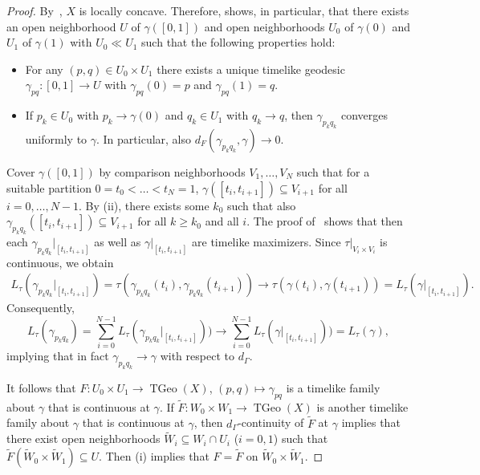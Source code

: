 \documentclass[a4paper,11pt]{article}
\numberwithin{equation}{section}
\theoremstyle{plain}
\theoremstyle{definition}
\DeclareMathOperator{\TGeo}{TGeo}
\begin{document}
\begin{proof} By~\cite[Rem.\ 2.2]{Eroes-Gieger25}, $X$ is locally concave. Therefore, \cite[Thm.\ 3.1]{Eroes-Gieger25} shows, in particular, that there exists an open neighborhood $U$ of $\gamma([0,1])$ and open neighborhoods $U_0$ of $\gamma(0)$ and $U_1$ of $\gamma(1)$ with $U_0 \ll U_1$ such that the following properties hold:
\begin{itemize}
\item[(i)] For any $(p,q)\in U_0\times U_1$ there exists a unique timelike geodesic $\gamma_{pq} \colon [0,1]\to U$ with $\gamma_{pq}(0)=p$ and $\gamma_{pq}(1)=q$.
\item[(ii)] If $p_k\in U_0$ with $p_k\to \gamma(0)$ and $q_k \in U_1$ with $q_k \to q$, then $\gamma_{p_kq_k}$ 
converges uniformly to $\gamma$. In particular, also $d_F(\gamma_{p_kq_k},\gamma) \to 0$.
\end{itemize}
Cover $\gamma([0,1])$ by comparison neighborhoods $V_1,\dots,V_N$ such that for a suitable partition $0=t_0<\dots<t_N=1$, 
$\gamma([t_i,t_{i+1}])\subseteq V_{i+1}$ for all $i=0,\dots,N-1$. By (ii), there exists some $k_0$ such that also $\gamma_{p_kq_k}([t_i,t_{i+1}])\subseteq V_{i+1}$ for all $k\ge k_0$ and all $i$. The proof of~\cite[Prop.\ 2.3]{Eroes-Gieger25} shows that 
then each $\gamma_{p_kq_k}|_{[t_i,t_{i+1}]}$ as well as $\gamma|_{[t_i,t_{i+1}]}$ are timelike maximizers. Since $\tau|_{V_i\times V_i}$ is
continuous, we obtain
\begin{align*}
L_\tau(\gamma_{p_kq_k}|_{[t_i,t_{i+1}]}) = \tau(\gamma_{p_kq_k}(t_i),\gamma_{p_kq_k}(t_{i+1})) \to \tau(\gamma(t_i),\gamma(t_{i+1}))
= L_\tau (\gamma|_{[t_i,t_{i+1}]}).
\end{align*}
Consequently, 
\[
L_\tau(\gamma_{p_kq_k}) = \sum_{i=0}^{N-1} L_\tau(\gamma_{p_kq_k}|_{[t_i,t_{i+1}]}))
\to \sum_{i=0}^{N-1} L_\tau(\gamma|_{[t_i,t_{i+1}]})) = L_\tau(\gamma),
\]
implying that in fact $\gamma_{p_kq_k} \to \gamma$ with respect to $d_\Gamma$. 

It follows that $F \colon U_0\times U_1 \to \TGeo(X)$, $(p,q) \mapsto \gamma_{pq}$ is a timelike family about $\gamma$ that is
continuous at $\gamma$. If $\tilde F \colon W_0\times W_1 \to \TGeo(X)$ is another timelike family about $\gamma$ that is continuous at $\gamma$, then $d_\Gamma$-continuity of $\tilde F$ at $\gamma$ implies that there exist open neighborhoods $\tilde W_i
\subseteq W_i\cap U_i$ ($i=0,1$) such that $\tilde F(\tilde W_0\times \tilde W_1) \subseteq U$. Then (i) implies that 
$F=\tilde F$ on $\tilde W_0\times \tilde W_1$.

\end{proof}
\end{document}
